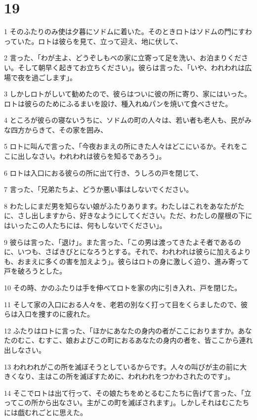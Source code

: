 \chapter{19}

\par 1 そのふたりのみ使は夕暮にソドムに着いた。そのときロトはソドムの門にすわっていた。ロトは彼らを見て、立って迎え、地に伏して、
\par 2 言った、「わが主よ、どうぞしもべの家に立寄って足を洗い、お泊まりください。そして朝早く起きてお立ちください」。彼らは言った、「いや、われわれは広場で夜を過ごします」。
\par 3 しかしロトがしいて勧めたので、彼らはついに彼の所に寄り、家にはいった。ロトは彼らのためにふるまいを設け、種入れぬパンを焼いて食べさせた。
\par 4 ところが彼らの寝ないうちに、ソドムの町の人々は、若い者も老人も、民がみな四方からきて、その家を囲み、
\par 5 ロトに叫んで言った、「今夜おまえの所にきた人々はどこにいるか。それをここに出しなさい。われわれは彼らを知るであろう」。
\par 6 ロトは入口におる彼らの所に出て行き、うしろの戸を閉じて、
\par 7 言った、「兄弟たちよ、どうか悪い事はしないでください。
\par 8 わたしにまだ男を知らない娘がふたりあります。わたしはこれをあなたがたに、さし出しますから、好きなようにしてください。ただ、わたしの屋根の下にはいったこの人たちには、何もしないでください」。
\par 9 彼らは言った、「退け」。また言った、「この男は渡ってきたよそ者であるのに、いつも、さばきびとになろうとする。それで、われわれは彼らに加えるよりも、おまえに多くの害を加えよう」。彼らはロトの身に激しく迫り、進み寄って戸を破ろうとした。
\par 10 その時、かのふたりは手を伸べてロトを家の内に引き入れ、戸を閉じた。
\par 11 そして家の入口におる人々を、老若の別なく打って目をくらましたので、彼らは入口を捜すのに疲れた。
\par 12 ふたりはロトに言った、「ほかにあなたの身内の者がここにおりますか。あなたのむこ、むすこ、娘およびこの町におるあなたの身内の者を、皆ここから連れ出しなさい。
\par 13 われわれがこの所を滅ぼそうとしているからです。人々の叫びが主の前に大きくなり、主はこの所を滅ぼすために、われわれをつかわされたのです」。
\par 14 そこでロトは出て行って、その娘たちをめとるむこたちに告げて言った、「立ってこの所から出なさい。主がこの町を滅ぼされます」。しかしそれはむこたちには戯むれごとに思えた。
